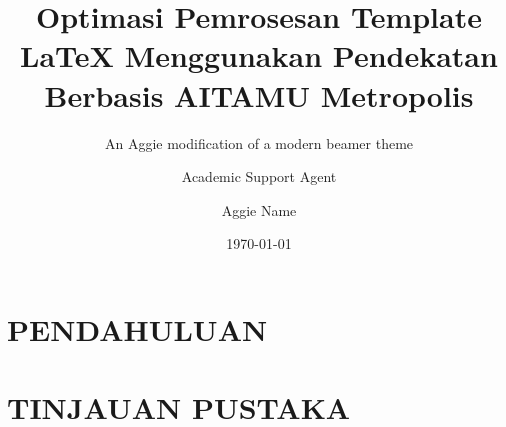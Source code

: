 \documentclass{beamer}
\title{Optimasi Pemrosesan Template LaTeX Menggunakan Pendekatan Berbasis AI}
\author{Academic Support Agent}
\date{\today}
\begin{document}
\maketitle

\begin{abstract}

\end{abstract}

\chapter{PENDAHULUAN}


\chapter{TINJAUAN PUSTAKA}




\usepackage{appendixnumberbeamer}

\usepackage{booktabs}
\usepackage[scale=2]{ccicons}

\usepackage{pgfplots}

\usepackage{xspace}
\newcommand{\themename}{\textbf{\textsc{metropolis}}\xspace}

\title{TAMU Metropolis}
\subtitle{An Aggie modification of a modern beamer theme}
\date{}
\author{Aggie Name}
\end{document}
